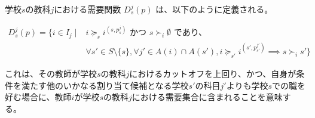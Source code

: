 \documentclass[12pt, a4paper]{article}
\theoremstyle{definition}
\theoremstyle{remark}
\theoremstyle{plain}
\begin{document}









学校$s$の教科$j$における需要関数 $D^j_s(p)$ は、以下のように定義される。

\begin{align*}
  D^j_s(p) = \{ i \in I_j \mid {} & i \succeq_s i^{(s,p^j_s)} \text{ かつ } s \succ_i \emptyset \text{ であり、} \\
  & \forall s' \in S\setminus \{s\}, \forall j' \in A(i) \cap A(s'), 
  i \succeq_{s'} i^{(s',p^{j'}_{s'})} \implies s \succ_i s' \}
\end{align*}

これは、その教師が学校$s$の教科$j$におけるカットオフを上回り、かつ、自身が条件を満たす他のいかなる割り当て候補となる学校$s'$の科目$j'$よりも学校$s$での職を好む場合に、教師$i$が学校$s$の教科$j$における需要集合に含まれることを意味する。



\end{document}

